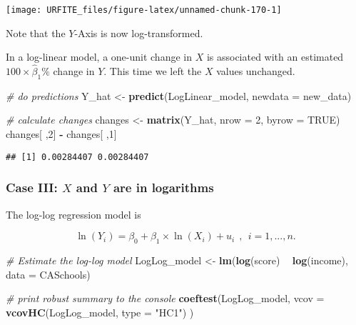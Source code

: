 \documentclass[]{book}
\newenvironment{Shaded}{\begin{snugshade}}{\end{snugshade}}
\newcommand{\KeywordTok}[1]{\textcolor[rgb]{0.13,0.29,0.53}{\textbf{#1}}}
\newcommand{\DataTypeTok}[1]{\textcolor[rgb]{0.13,0.29,0.53}{#1}}
\newcommand{\DecValTok}[1]{\textcolor[rgb]{0.00,0.00,0.81}{#1}}
\newcommand{\StringTok}[1]{\textcolor[rgb]{0.31,0.60,0.02}{#1}}
\newcommand{\CommentTok}[1]{\textcolor[rgb]{0.56,0.35,0.01}{\textit{#1}}}
\newcommand{\OtherTok}[1]{\textcolor[rgb]{0.56,0.35,0.01}{#1}}
\newcommand{\OperatorTok}[1]{\textcolor[rgb]{0.81,0.36,0.00}{\textbf{#1}}}
\newcommand{\NormalTok}[1]{#1}
\theoremstyle{definition}
\theoremstyle{definition}
\theoremstyle{definition}
\theoremstyle{remark}
\begin{document}
\begin{center}\texttt{[image: URFITE\_files/figure-latex/unnamed-chunk-170-1]} \end{center}

Note that the \(Y\)-Axis is now log-transformed.

In a log-linear model, a one-unit change in \(X\) is associated with an
estimated \(100 \times \hat\beta_1 \%\) change in \(Y\). This time we
left the \(X\) values unchanged.

\begin{Shaded}
\begin{Highlighting}[]
\CommentTok{# do predictions}
\NormalTok{Y_hat <-}\StringTok{ }\KeywordTok{predict}\NormalTok{(LogLinear_model, }\DataTypeTok{newdata =}\NormalTok{ new_data)}

\CommentTok{# calculate changes}
\NormalTok{changes <-}\StringTok{ }\KeywordTok{matrix}\NormalTok{(Y_hat, }\DataTypeTok{nrow =} \DecValTok{2}\NormalTok{, }\DataTypeTok{byrow =} \OtherTok{TRUE}\NormalTok{)}
\NormalTok{changes[ ,}\DecValTok{2}\NormalTok{] }\OperatorTok{-}\StringTok{ }\NormalTok{changes[ ,}\DecValTok{1}\NormalTok{]}
\end{Highlighting}
\end{Shaded}

\begin{verbatim}
## [1] 0.00284407 0.00284407
\end{verbatim}

\subsubsection*{\texorpdfstring{Case III: \(X\) and \(Y\) are in
logarithms}{Case III: X and Y are in logarithms}}\label{case-iii-x-and-y-are-in-logarithms}

The log-log regression model is

\[\ln(Y_i) = \beta_0 + \beta_1 \times \ln(X_i) + u_i \ \ , \ \ i=1,...,n. \]

\begin{Shaded}
\begin{Highlighting}[]
\CommentTok{# Estimate the log-log model}
\NormalTok{LogLog_model <-}\StringTok{ }\KeywordTok{lm}\NormalTok{(}\KeywordTok{log}\NormalTok{(score) }\OperatorTok{~}\StringTok{ }\KeywordTok{log}\NormalTok{(income), }\DataTypeTok{data =}\NormalTok{ CASchools)}

\CommentTok{# print robust summary to the console}
\KeywordTok{coeftest}\NormalTok{(LogLog_model, }
         \DataTypeTok{vcov =} \KeywordTok{vcovHC}\NormalTok{(LogLog_model, }\DataTypeTok{type =} \StringTok{"HC1"}\NormalTok{)}
\NormalTok{         )}
\end{Highlighting}
\end{Shaded}
\end{document}
